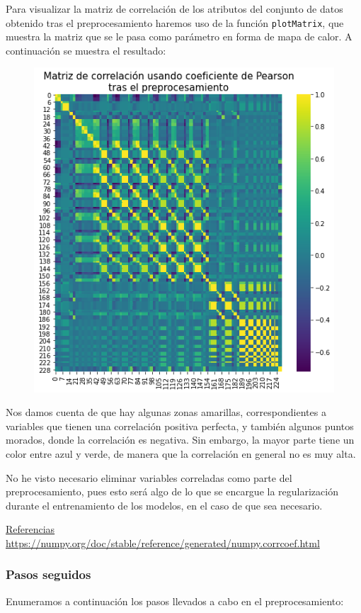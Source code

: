 \documentclass[a4]{article}
\begin{document}
Para visualizar la matriz de correlación de los atributos del conjunto de datos obtenido tras el preprocesamiento haremos uso de la función \lstinline|plotMatrix|, que muestra la matriz que se le pasa como parámetro en forma de mapa de calor. A continuación se muestra el resultado: 
\begin{figure}[H]
	\centering
	\includegraphics[width=0.6\linewidth]{img/corr}
	\caption{}
	\label{fig:corr}
\end{figure}

Nos damos cuenta de que hay algunas zonas amarillas, correspondientes a variables que tienen una correlación positiva perfecta, y también algunos puntos morados, donde la correlación es negativa. Sin embargo, la mayor parte tiene un color entre azul y verde, de manera que la correlación en general no es muy alta. 

No he visto necesario eliminar variables correladas como parte del preprocesamiento, pues esto será algo de lo que se encargue la regularización durante el entrenamiento de los modelos, en el caso de que sea necesario. 

\underline{Referencias}
\href{https://numpy.org/doc/stable/reference/generated/numpy.corrcoef.html}{https://numpy.org/doc/stable/reference/generated/numpy.corrcoef.html}

\subsubsection{Pasos seguidos}

Enumeramos a continuación los pasos llevados a cabo en el preprocesamiento:
\end{document}
